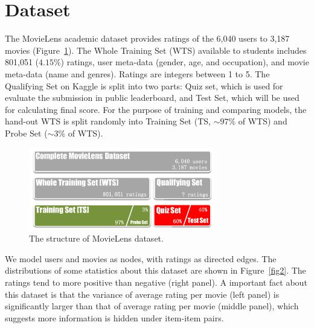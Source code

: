 \documentclass[journal]{IEEEtran}
\begin{document}
\section{Dataset}
The MovieLens academic dataset provides ratings of the 6,040 users to 3,187 movies (Figure~\ref{fig1}). The Whole Training Set (WTS) available to students includes 801,051 ($4.15\%$) ratings, user meta-data (gender, age, and occupation), and movie meta-data (name and genres). Ratings are integers between 1 to 5. The Qualifying Set on Kaggle is split into two parts: Quiz set, which is used for evaluate the submission in public leaderboard, and Test Set, which will be used for calculating final score. For the purpose of training and comparing models, the hand-out WTS is split randomly into Training Set (TS, $\sim97\%$ of WTS) and Probe Set ($\sim3\%$ of WTS). 
\begin{figure}[ht]
\begin{center}
\includegraphics[width=3.2in]{fig/dataset}
\caption{The structure of MovieLens dataset. }
\label{fig1}
\end{center}
\end{figure}

We model users and movies as nodes, with ratings as directed edges. The distributions of some statistics about this dataset are shown in Figure~\ref{fig2}. The ratings tend to more positive than negative (right panel). A important fact about this dataset is that the variance of average rating per movie (left panel) is significantly larger than that of average rating per movie (middle panel), which suggests more information is hidden under item-item pairs.
\end{document}
